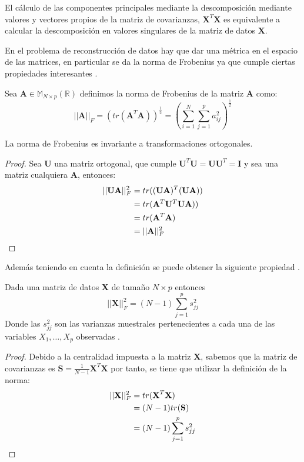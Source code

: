 \begin{coro}
El cálculo de las componentes principales mediante la descomposición mediante valores y vectores propios de la matriz de covarianzas, $\mathbf{X}^T\mathbf{X}$ es equivalente a calcular la descomposición en valores singulares de la matriz de datos $\mathbf{X}$. 
\end{coro}
\noindent En el problema de reconstrucción de datos hay que dar una métrica en el espacio de las matrices, en particular se da la norma de Frobenius ya que cumple ciertas propiedades interesantes \cite{Golub 1987}.

\begin{defi}
Sea $\textbf{A}\in \mathbb{M}_{N\times p}(\mathbb{R})$ definimos la norma de Frobenius de la matriz \textbf{A} como:
\begin{equation}
||\textbf{A}||_F=(tr(\textbf{A}^T \textbf{A}))^{\frac{1}{2}}=\left(\sum_{i=1}^{N}\sum _{j=1}^{p}a_{ij}^2\right)^{\frac{1}{2}}
\end{equation}
\end{defi}

\begin{propo}
La norma de Frobenius es invariante a transformaciones ortogonales.
\begin{proof}
Sea $\mathbf{U}$ una matriz ortogonal, que cumple $\mathbf{U}^T \mathbf{U}=\mathbf{U} \mathbf{U}^T=\textbf{I}$ y  sea una matriz cualquiera $\mathbf{A}$, entonces:
\begin{align*}
||\mathbf{U}  \mathbf{A}||_F^2&=tr((\mathbf{U} \mathbf{A})^T(\mathbf{U} \mathbf{A}))\\
&=tr(\mathbf{A}^T \mathbf{U}^T \mathbf{U} \mathbf{A}))\\
&=tr(\mathbf{A}^T \mathbf{A})\\
&=||\mathbf{A}||_F^2\qedhere
\end{align*}
\end{proof}
\end{propo}

\noindent Además teniendo en cuenta la definición se puede obtener la siguiente propiedad \cite{Chatfield 1989}.

\begin{propo}
Dada una matriz de datos \textbf{X} de tamaño $N\times p$ entonces
\begin{equation}
||\textbf{X}||_F^2=(N-1)\sum_{j=1}^p s_{jj}^2
\end{equation}
Donde las $s_{jj}^2$ son las varianzas muestrales pertenecientes a cada una de las variables $X_1,\ldots,X_p$ observadas .
\begin{proof}
Debido a la centralidad impuesta a la matriz \textbf{X}, sabemos que la matriz de covarianzas es $\textbf{S}=\frac{1}{N-1}\textbf{X}^T \textbf{X}$ por tanto, se tiene que utilizar la definición de la norma:
\begin{align*}
||\textbf{X}||_F^2 &= tr(\textbf{X}^T\textbf{X})\\
&= (N-1) tr(\textbf{S})\\
&= (N-1) \sum_{j=1}^p s_{jj}^2 \qedhere
\end{align*}
\end{proof}
\end{propo}

